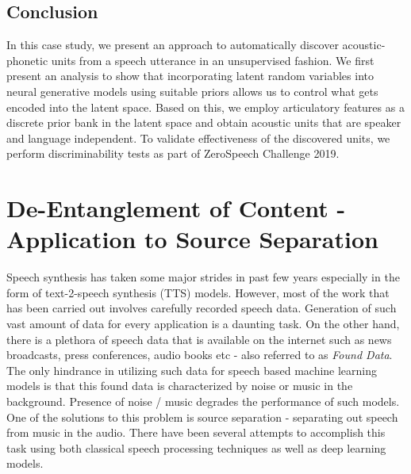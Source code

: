 

\label{analysis}


\subsection{Conclusion}

In this case study, we present an approach to automatically discover acoustic-phonetic units from a speech utterance in an unsupervised fashion. We first present an analysis to show that incorporating latent random variables into neural generative models using suitable priors allows us to control what gets encoded into the latent space. Based on this, we employ articulatory features as a discrete prior bank in the latent space and obtain acoustic units that are speaker and language independent.  To validate effectiveness of the discovered units, we perform discriminability tests as part of ZeroSpeech Challenge 2019. 


\section{De-Entanglement of Content - Application to Source Separation}



\noindent Speech synthesis has taken some major strides in past few years especially in the form of text-2-speech synthesis (TTS) models. However, most of the work that has been carried out involves carefully recorded speech data. Generation of such vast amount of data for every application is a daunting task. On the other hand, there is a plethora of speech data that is available on the internet such as news broadcasts, press conferences, audio books etc - also referred to as \textit{Found Data}. The only hindrance in utilizing such data for speech based machine learning models is that this found data is characterized by noise or music in the background. Presence of noise / music degrades the performance of such models. One of the solutions to this problem is source separation - separating out speech from music in the audio. There have been several attempts to accomplish this task using both classical speech processing techniques as well as deep learning models.\\

